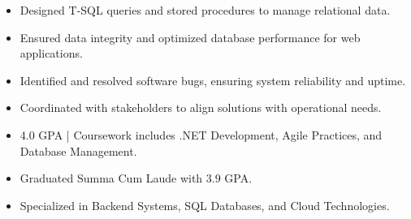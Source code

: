 \par\smallskip
\noindent
\begin{minipage}{20cm}
  \begin{minipage}{9.75cm}
    \begin{itemize}
      \item Designed T-SQL queries and stored procedures to manage relational data.
      \item Ensured data integrity and optimized database performance for web applications.
    \end{itemize}
  \end{minipage}
  \hfill
  \begin{minipage}{9.75cm}
    \begin{itemize}
      \item Identified and resolved software bugs, ensuring system reliability and uptime.
      \item Coordinated with stakeholders to align solutions with operational needs.
    \end{itemize}
  \end{minipage}
\end{minipage}
\par\smallskip
\divider

\begin{itemize}
  \item 4.0 GPA | Coursework includes .NET Development, Agile Practices, and Database Management.
\end{itemize}
\divider

\begin{itemize}
  \item Graduated Summa Cum Laude with 3.9 GPA.
  \item Specialized in Backend Systems, SQL Databases, and Cloud Technologies.
\end{itemize}

\noindent
\begin{minipage}{20cm}
\end{minipage}


